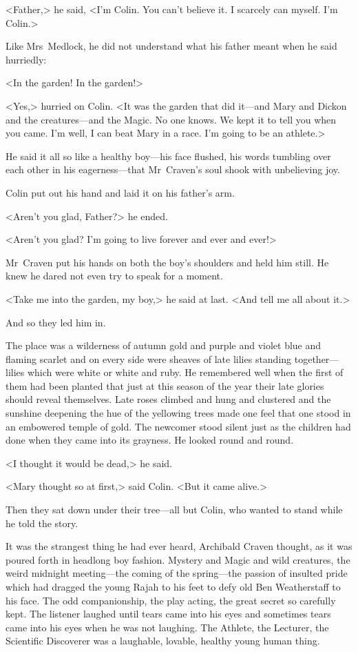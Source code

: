 <Father,> he said, <I'm Colin. You can't believe it. I scarcely can myself. I'm Colin.>

Like Mrs~Medlock, he did not understand what his father meant when he said hurriedly:

<In the garden! In the garden!>

<Yes,> hurried on Colin. <It was the garden that did it—and Mary and Dickon and the creatures—and the Magic. No one knows. We kept it to tell you when you came. I'm well, I can beat Mary in a race. I'm going to be an athlete.>

He said it all so like a healthy boy—his face flushed, his words tumbling over each other in his eagerness—that Mr~Craven's soul shook with unbelieving joy.

Colin put out his hand and laid it on his father's arm.

<Aren't you glad, Father?> he ended.

<Aren't you glad? I'm going to live forever and ever and ever!>

Mr~Craven put his hands on both the boy's shoulders and held him still. He knew he dared not even try to speak for a moment.

<Take me into the garden, my boy,> he said at last. <And tell me all about it.>

And so they led him in.

The place was a wilderness of autumn gold and purple and violet blue and flaming scarlet and on every side were sheaves of late lilies standing together—lilies which were white or white and ruby. He remembered well when the first of them had been planted that just at this season of the year their late glories should reveal themselves. Late roses climbed and hung and clustered and the sunshine deepening the hue of the yellowing trees made one feel that one stood in an embowered temple of gold. The newcomer stood silent just as the children had done when they came into its grayness. He looked round and round.

<I thought it would be dead,> he said.

<Mary thought so at first,> said Colin. <But it came alive.>

Then they sat down under their tree—all but Colin, who wanted to stand while he told the story.

It was the strangest thing he had ever heard, Archibald Craven thought, as it was poured forth in headlong boy fashion. Mystery and Magic and wild creatures, the weird midnight meeting—the coming of the spring—the passion of insulted pride which had dragged the young Rajah to his feet to defy old Ben Weatherstaff to his face. The odd companionship, the play acting, the great secret so carefully kept. The listener laughed until tears came into his eyes and sometimes tears came into his eyes when he was not laughing. The Athlete, the Lecturer, the Scientific Discoverer was a laughable, lovable, healthy young human thing.

